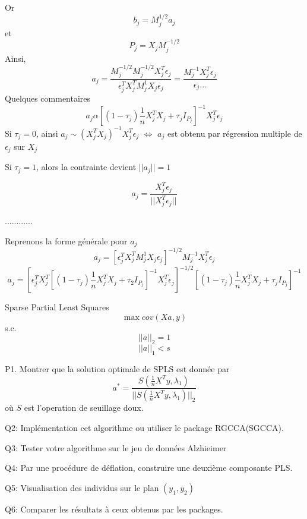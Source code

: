 \documentclass{article}
\begin{document}
Or
\begin{equation}
b_j=M_j^{1/2}a_j
\end{equation}
et
\begin{equation}
P_j=X_jM_j^{-1/2}
\end{equation}
Ainsi,
\begin{equation}
a_j=\frac{M_j^{-1/2}M_j^{-1/2}X_j^T\epsilon_j}{\epsilon_j^TX_j^TM_j^1X_j\epsilon_j}=\frac{M_j^{-1}X_j^T\epsilon_j}{\epsilon_j\ldots}
\end{equation}
Quelques commentaires
\begin{equation}
a_j\alpha [(1-\tau_j)\frac{1}{n}X^T_jX_j+\tau_jI_{P_j}]^{-1}X_j^T\epsilon_j
\end{equation}
Si $\tau_j=0$, ainsi $a_j\sim (X_j^TX_j)^{-1}X_j^T\epsilon_j$
$\Leftrightarrow$ $a_j$ est obtenu par r\'egression multiple de $\epsilon_j$ sur $X_j$

Si $\tau_j=1$, alors la contrainte devient  $||a_j||=1$

\begin{equation}
a_j=\frac{X_j^T\epsilon_j}{||X_j^T\epsilon_j||}
\end{equation}

............

Reprenons la forme g\'en\'erale pour $a_j$
\begin{equation}
a_j=[\epsilon_j^TX_j^TM_j^1X_j\epsilon_j]^{-1/2}M_j^{-1}X_j^T\epsilon_j
\end{equation}
\begin{equation}
a_j=[\epsilon_j^TX_j^T[(1-\tau_j)\frac{1}{n}X_j^TX_j+\tau_2 I_{P_j}]^{-1}X_j^T\epsilon_j]^{-1/2}[(1-\tau_j)\frac{1}{n}X_j^TX_j+\tau_j I_{P_j}]^{-1}
\end{equation}


Sparse Partial Least Squares
\begin{equation}
\max cov(Xa,y)
\end{equation}
s.c.
\begin{equation}
||a||_2=1
\end{equation}
\begin{equation}
||a||_1<s
\end{equation}

P1. Montrer que la solution optimale de SPLS est donn\'ee par 
\begin{equation}
a^*=\frac{S(\frac{1}{n}X^Ty,\lambda_1)}{||S(\frac{1}{n}X^Ty,\lambda_1)||_2}
\end{equation}
o\`u $S$ est l'operation de seuillage doux.

Q2: Impl\'ementation cet algorithme ou utiliser le package RGCCA(SGCCA).

Q3: Tester votre algorithme sur le jeu de donn\'ees Alzhieimer

Q4: Par une proc\'edure de d\'eflation, construire une deuxi\`eme composante PLS.

Q5: Visualisation des individus sur le plan $(y_1,y_2)$

Q6: Comparer les r\'esultats \`a ceux obtenus par les packages.
\end{document}
